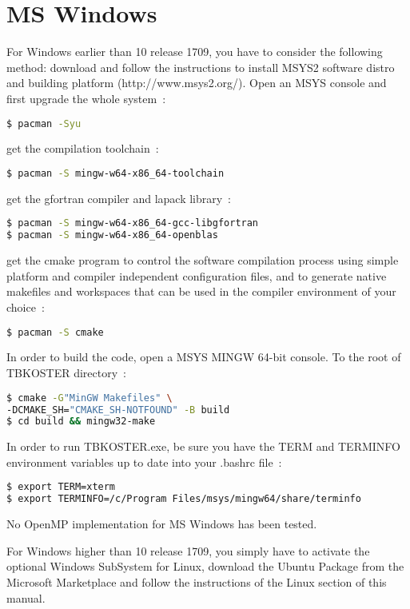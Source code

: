 \documentclass[12pt, onecolumn]{memoir}
\begin{document}
\section{MS Windows}
For Windows earlier than 10 release 1709, you have to consider the following method:
download and follow the instructions to install MSYS2 software distro and building platform (http://www.msys2.org/). Open an MSYS console and first upgrade the whole system~:
\begin{lstlisting}[language=sh,basicstyle=\small\ttfamily]
$ pacman -Syu
\end{lstlisting}
get the compilation toolchain~:
\begin{lstlisting}[language=sh,basicstyle=\small\ttfamily]
$ pacman -S mingw-w64-x86_64-toolchain
\end{lstlisting}
get the gfortran compiler and lapack library~:
\begin{lstlisting}[language=sh,basicstyle=\small\ttfamily,frame=single]
$ pacman -S mingw-w64-x86_64-gcc-libgfortran
$ pacman -S mingw-w64-x86_64-openblas
\end{lstlisting}
get the cmake program to control the software compilation process using simple platform and compiler independent configuration files, and to generate native makefiles and workspaces that can be used in the compiler environment of your choice~:
\begin{lstlisting}[language=bash,basicstyle=\small\ttfamily]
$ pacman -S cmake
\end{lstlisting}

In order to build the code, open a MSYS MINGW 64-bit console. To the root of TBKOSTER directory~:
\begin{lstlisting}[language=sh,basicstyle=\small\ttfamily,frame=single]
$ cmake -G"MinGW Makefiles" \
-DCMAKE_SH="CMAKE_SH-NOTFOUND" -B build
$ cd build && mingw32-make
\end{lstlisting}
In order to run TBKOSTER.exe, be sure you have the TERM and TERMINFO environment variables up to date into your .bashrc file~:
\begin{lstlisting}[language=sh,basicstyle=\small\ttfamily]
$ export TERM=xterm
$ export TERMINFO=/c/Program Files/msys/mingw64/share/terminfo
\end{lstlisting}
No OpenMP implementation for MS Windows has been tested.

For Windows higher than 10 release 1709, you simply have to activate the optional Windows SubSystem for Linux, download the Ubuntu Package from the Microsoft Marketplace and follow the instructions of the Linux section of this manual.
\vfil
\end{document}
